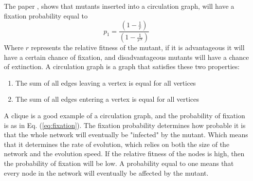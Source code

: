The paper \cite{lieberman2005evolutionary}, shows that mutants inserted into a circulation graph, will have a fixation probability equal to
\begin{equation}  
p_{1}=\frac{(1-\frac{1}{r})}{(1-\frac{1}{r^{N}})}
 \label{eq:fixation} 
\end{equation}
Where $r$ represents the relative fitness of the mutant, if it is advantageous it will have a certain chance of fixation, and disadvantageous mutants will have a chance of extinction. A circulation graph is a graph that satisfies these two properties: 
\begin{enumerate}
\item The sum of all edges leaving a vertex is equal for all vertices
\item The sum of all edges entering a vertex is equal for all vertices
\end{enumerate}
A clique is a good example of a circulation graph, and the probability of fixation is as in Eq. (\ref{eq:fixation}).
The fixation probability determines how probable it is that the whole network will eventually be
"infected" by the mutant. Which means that it determines the rate of evolution, which relies on both the size of the
network and the evolution speed. 
If the relative fitness of the nodes is high, then the probability of fixation will be low.
A probability equal to one means that every node in the network will eventually be affected by the mutant.

